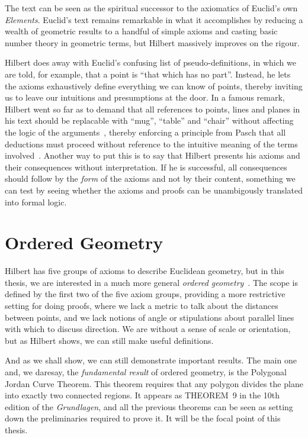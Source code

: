 The text can be seen as the spiritual successor to the axiomatics of Euclid's own \emph{Elements}. Euclid's text remains remarkable in what it accomplishes by reducing a wealth of geometric results to a handful of simple axioms and casting basic number theory in geometric terms, but Hilbert massively improves on the rigour.

Hilbert does away with Euclid's confusing list of pseudo-definitions, in which we are told, for example, that a point is ``that which has no part''. Instead, he lets the axioms exhaustively define everything we can know of points, thereby inviting us to leave our intuitions and presumptions at the door. In a famous remark, Hilbert went so far as to demand that all references to points, lines and planes in his text should be replacable with ``mug'', ``table'' and ``chair'' without affecting the logic of the arguments~\cite{TableChairMug}, thereby enforcing a principle from Pasch that all deductions must proceed without reference to the intuitive meaning of the terms involved~\cite{PaschToPeano}. Another way to put this is to say that Hilbert presents his axioms and their consequences without interpretation. If he is successful, all consequences should follow by the \emph{form} of the axioms and not by their content, something we can test by seeing whether the axioms and proofs can be unambigously translated into formal logic.

\section{Ordered Geometry}
Hilbert has five groups of axioms to describe Euclidean geometry, but in this thesis, we are interested in a much more general \emph{ordered geometry}~\cite{AxiomaticsOrderedGeometry}. The scope is defined by the first two of the five axiom groups, providing a more restrictive setting for doing proofs, where we lack a metric to talk about the distances between points, and we lack notions of angle or stipulations about parallel lines with which to discuss direction. We are without a sense of scale or orientation, but as Hilbert shows, we can still make useful definitions.

And as we shall show, we can still demonstrate important results. The main one and, we daresay, the \emph{fundamental result} of ordered geometry, is the Polygonal Jordan Curve Theorem. This theorem requires that any polygon divides the plane into exactly two connected regions. It appears as THEOREM~9 in the 10th edition of the \emph{Grundlagen}, and all the previous theorems can be seen as setting down the preliminaries required to prove it. It will be the focal point of this thesis.

